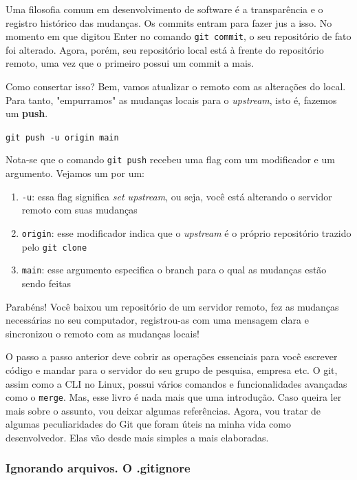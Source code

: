 \documentclass{article}
\begin{document}
  Uma filosofia comum em desenvolvimento de software é a transparência e o registro histórico das mudanças. Os commits entram
  para fazer jus a isso. No momento em que digitou Enter no comando \texttt{git commit}, o seu repositório de fato foi alterado. 
  Agora, porém, seu repositório local está à frente do repositório remoto, uma vez que o primeiro possui um commit a mais. 

  Como consertar isso? Bem, vamos atualizar o remoto com as alterações do local. Para tanto, "empurramos" as mudanças locais 
  para o \textit{upstream}, isto é, fazemos um \textbf{push}.

  \vspace{1ex}
  \texttt{git push -u origin main}
  \vspace{1ex}

  Nota-se que o comando \texttt{git push} recebeu uma flag com um modificador e um argumento. Vejamos um por um: 

  \begin{enumerate}
	\item{\texttt{-u}: essa flag significa \textit{set upstream}, ou seja, você está alterando o servidor remoto com suas mudanças}
	\item{\texttt{origin}: esse modificador indica que o \textit{upstream} é o próprio repositório trazido pelo \texttt{git clone}}
	\item{\texttt{main}: esse argumento especifica o branch para o qual as mudanças estão sendo feitas}
  \end{enumerate}

  Parabéns! Você baixou um repositório de um servidor remoto, fez as mudanças necessárias no seu computador, registrou-as com uma
  mensagem clara e sincronizou o remoto com as mudanças locais!  


  O passo a passo anterior deve cobrir as operações essenciais para você escrever código e mandar para o servidor do seu grupo 
  de pesquisa, empresa etc. O git, assim como a CLI no Linux, possui vários comandos e funcionalidades avançadas como o \texttt{merge}.
  Mas, esse livro é nada mais que uma introdução. Caso queira ler mais sobre o assunto, vou deixar algumas referências. 
  Agora, vou tratar de algumas peculiaridades do Git que foram úteis na minha vida como desenvolvedor. Elas vão desde mais simples a 
  mais elaboradas. 

  \subsubsection{Ignorando arquivos. O .gitignore}
\end{document}
